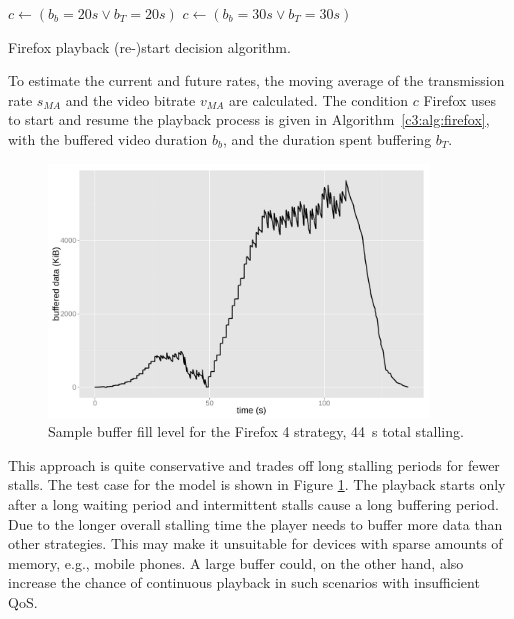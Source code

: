 \begin{algorithm}[htb]
	\centering
	\begin{algorithmic}
		\STATE $c \gets ( b_b=20s \lor b_T=20s )$
	\ELSE
		\STATE $c \gets ( b_b=30s \lor b_T=30s )$
	\ENDIF
	\end{algorithmic}
	\caption{Firefox playback (re-)start decision algorithm.}
\label{c3:alg:firefox}
\end{algorithm}

To estimate the current and future rates, the moving average of the transmission rate $s_{MA}$ and the video bitrate $v_{MA}$ are calculated. The condition $c$ Firefox uses to start and resume the playback process is given in Algorithm~\ref{c3:alg:firefox}, with the buffered video duration $b_b$, and the duration spent buffering $b_T$.

 \begin{figure}[htb]
	\centering
	\includegraphics[width=0.9\textwidth]{images/R-bufferlevel-firefox.pdf}
	\caption{Sample buffer fill level for the Firefox 4 strategy, \SI{44}{\second} total stalling.}
\label{c3:fig:bufferlevel-firefox}
\end{figure}

This approach is quite conservative and trades off long stalling periods for fewer stalls. The test case for the model is shown in Figure \ref{c3:fig:bufferlevel-firefox}. The playback starts only after a long waiting period and intermittent stalls cause a long buffering period. Due to the longer overall stalling time the player needs to buffer more data than other strategies. This may make it unsuitable for devices with sparse amounts of memory, e.g., mobile phones. A large buffer could, on the other hand, also increase the chance of continuous playback in such scenarios with insufficient \gls{QoS}.


